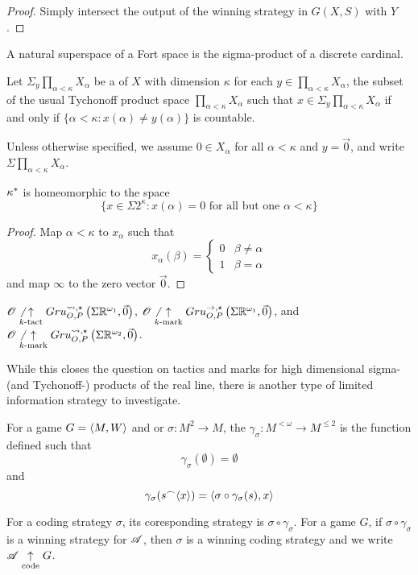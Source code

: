 \begin{proof}
  Simply intersect the output of the winning strategy in $G(X,S)$ with $Y$.
\end{proof}

A natural superspace of a Fort space is the sigma-product of a discrete
cardinal.

\begin{defn}
  Let $\Sigma_{y} \prod_{\alpha<\kappa}X_\alpha$ be a  of
  $X$ with dimension $\kappa$ for each $y\in \prod_{\alpha<\kappa}X_\alpha$,
  the subset of the usual Tychonoff product space $\prod_{\alpha<\kappa}X_\alpha$
  such that $x\in \Sigma_y \prod_{\alpha<\kappa}X_\alpha$
  if and only if $\{\alpha<\kappa : x(\alpha)\not=y(\alpha)\}$ is countable.

  Unless otherwise specified, we assume $0\in X_\alpha$ for all $\alpha<\kappa$
  and $y=\vec 0$, and write $\Sigma \prod_{\alpha<\kappa}X_\alpha$.
\end{defn}

\begin{prop}
  $\kappa^*$ is homeomorphic to the space
  \[
    \{
    x\in \Sigma 2^\kappa
      :
    x(\alpha)=0 \text{ for all but one } \alpha<\kappa
    \}
  \]
\end{prop}

\begin{proof}
  Map $\alpha<\kappa$ to $x_\alpha$ such that
  \[
    x_\alpha(\beta) =
    \left\{
      \begin{array}{ll}
        0 & \beta\not=\alpha \\
        1 & \beta=\alpha
      \end{array}
    \right.
  \]
  and map $\infty$ to the zero vector $\vec0$.
\end{proof}

\begin{cor}
  $\mathscr{O}\not\underset{k\text{-tact}}{\uparrow}Gru_{O,P}^{\leadsto,\star}\left({\Sigma\mathbb{R}^{\omega_1}},{\vec0}\right)$,
  $\mathscr{O}\not\underset{k\text{-mark}}{\uparrow}Gru_{O,P}^{\to,\star}\left({\Sigma\mathbb{R}^{\omega_1}},{\vec0}\right)$, and
  $\mathscr{O}\not\underset{k\text{-mark}}{\uparrow}Gru_{O,P}^{\leadsto,\star}\left({\Sigma\mathbb{R}^{\omega_2}},{\vec0}\right)$.
\end{cor}

While this closes the question on tactics and marks for high dimensional
sigma- (and Tychonoff-) products of the real line, there is another type of
limited information strategy to investigate.

\begin{defn}
  For a game $G=\langle M,W\rangle$ and  or 
  $\sigma:M^2\to M$, the 
  $\gamma_\sigma: M^{<\omega}\to M^{\leq2}$ is the function defined such that
    \[
      \gamma_\sigma(\emptyset) = \emptyset
    \]
  and
    \[
      \gamma_\sigma(s{^\frown}\langle x\rangle) = \langle\sigma\circ\gamma_\sigma(s),x\rangle
    \]

  For a coding strategy $\sigma$, its coresponding strategy is
  $\sigma\circ\gamma_\sigma$. For a game $G$, if $\sigma\circ\gamma_\sigma$
  is a winning strategy for $\mathscr{A}$, then $\sigma$ is a winning coding
  strategy and we write $\mathscr{A} \underset{\text{code}}{\uparrow} G$.
\end{defn}

